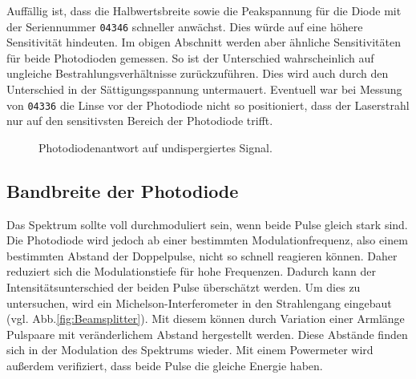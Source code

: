 \documentclass[bachelor,       %
               twoside,        %
               BCOR10mm,       %
               liststotoc,nomtotoc,bibtotoc, %
               english,ngerman, %
               final,          %
               ]{GAUBM}
\begin{document}
Auffällig ist, dass die Halbwertsbreite sowie die Peakspannung für die Diode mit der Seriennummer \texttt{04346} schneller anwächst.
Dies würde auf eine höhere Sensitivität hindeuten.
Im obigen Abschnitt werden aber ähnliche Sensitivitäten für beide Photodioden gemessen.
So ist der Unterschied wahrscheinlich auf ungleiche Bestrahlungsverhältnisse zurückzuführen.
Dies wird auch durch den Unterschied in der Sättigungsspannung untermauert.
Eventuell war bei Messung von \texttt{04336} die Linse vor der Photodiode nicht so positioniert, dass der Laserstrahl nur auf den sensitivsten Bereich der Photodiode trifft.
\clearpage
\begin{figure}[!htb]
	\centering
   \hfill
	\caption{Photodiodenantwort auf undispergiertes Signal.}
	\label{fig:PDundisp}
\end{figure}

\subsection{Bandbreite der Photodiode}
Das Spektrum sollte voll durchmoduliert sein, wenn beide Pulse gleich stark sind.
Die Photodiode wird jedoch ab einer bestimmten Modulationfrequenz, also einem bestimmten Abstand der Doppelpulse, nicht so schnell reagieren können.
Daher reduziert sich die Modulationstiefe für hohe Frequenzen.
Dadurch kann der Intensitätsunterschied der beiden Pulse überschätzt werden.
Um dies zu untersuchen, wird ein Michelson-Interferometer in den Strahlengang eingebaut (vgl. Abb.\ref{fig:Beamsplitter}).
Mit diesem können durch Variation einer Armlänge Pulspaare mit veränderlichem Abstand hergestellt werden.
Diese Abstände finden sich in der Modulation des Spektrums wieder.
Mit einem Powermeter wird außerdem verifiziert, dass beide Pulse die gleiche Energie haben.
\end{document}

